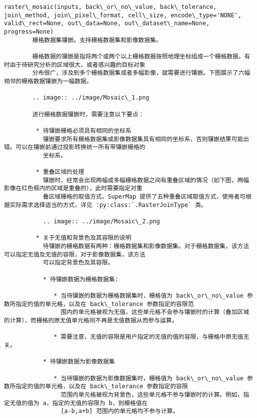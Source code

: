 \documentclass[11pt]{article}
\begin{document}
\begin{Verbatim}[commandchars=\\\{\}]
    raster\_mosaic(inputs, back\_or\_no\_value, back\_tolerance, join\_method, join\_pixel\_format, cell\_size, encode\_type='NONE', valid\_rect=None, out\_data=None, out\_dataset\_name=None, progress=None)
        栅格数据集镶嵌。支持栅格数据集和影像数据集。
        
        栅格数据的镶嵌是指将两个或两个以上栅格数据按照地理坐标组成一个栅格数据。有时由于待研究分析的区域很大，或者感兴趣的目标对象
        分布很广，涉及到多个栅格数据集或者多幅影像，就需要进行镶嵌。下图展示了六幅相邻的栅格数据镶嵌为一幅数据。
        
        .. image:: ../image/Mosaic\_1.png
        
        进行栅格数据镶嵌时，需要注意以下要点：
        
         * 待镶嵌栅格必须具有相同的坐标系
           镶嵌要求所有栅格数据集或影像数据集具有相同的坐标系，否则镶嵌结果可能出错。可以在镶嵌前通过投影转换统一所有带镶嵌栅格的
           坐标系。
        
         * 重叠区域的处理
           镶嵌时，经常会出现两幅或多幅栅格数据之间有重叠区域的情况（如下图，两幅影像在红色框内的区域是重叠的），此时需要指定对重
           叠区域栅格的取值方式。SuperMap 提供了五种重叠区域取值方式，使用者可根据实际需求选择适当的方式，详见 :py:class:`.RasterJoinType` 类。
        
           .. image:: ../image/Mosaic\_2.png
        
         * 关于无值和背景色及其容限的说明
           待镶嵌的栅格数据有两种：栅格数据集和影像数据集。对于栅格数据集，该方法可以指定无值及无值的容限，对于影像数据集，该方法
           可以指定背景色及其容限。
        
           * 待镶嵌数据为栅格数据集:
        
              * 当待镶嵌的数据为栅格数据集时，栅格值为 back\_or\_no\_value 参数所指定的值的单元格，以及在 back\_tolerance 参数指定的容限范
                围内的单元格被视为无值，这些单元格不会参与镶嵌时的计算（叠加区域的计算），而栅格的原无值单元格则不再是无值数据从而参与运算。
        
              * 需要注意，无值的容限是用户指定的无值的值的容限，与栅格中原无值无关。
        
           * 待镶嵌数据为影像数据集
        
              * 当待镶嵌的数据为影像数据集时，栅格值为 back\_or\_no\_value 参数所指定的值的单元格，以及在 back\_tolerance 参数指定的容限
                范围内单元格被视为背景色，这些单元格不参与镶嵌时的计算。例如，指定无值的值为 a，指定的无值的容限为 b，则栅格值在
                [a-b,a+b] 范围内的单元格均不参与计算。
        

\end{Verbatim}
\end{document}
